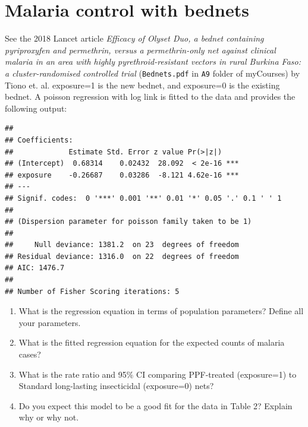 \documentclass[landscape,twocolumn,letterpaper,9pt,reqno]{article}\usepackage[]{graphicx}\usepackage[]{color}
\newenvironment{knitrout}{}{} %
\newcommand{\compresslist}{ %
	\setlength{\itemsep}{1pt}
	\setlength{\parskip}{0pt}
	\setlength{\parsep}{0pt}
}
\begin{document}
\clearpage


\section{Malaria control with bednets}

See the 2018 Lancet article \textit{Efficacy of Olyset Duo, a bednet containing pyriproxyfen and permethrin, versus a permethrin-only net against clinical malaria in an area with highly pyrethroid-resistant vectors in rural Burkina Faso: a cluster-randomised
	controlled trial} (\texttt{Bednets.pdf} in \texttt{A9} folder of myCourses) by Tiono et. al. exposure=1 is the new bednet, and exposure=0 is the existing bednet. A poisson regression with log link is fitted to the data and provides the following output:




\begin{knitrout}
\color{fgcolor}
\begin{verbatim}
## 
## Coefficients:
##             Estimate Std. Error z value Pr(>|z|)    
## (Intercept)  0.68314    0.02432  28.092  < 2e-16 ***
## exposure    -0.26687    0.03286  -8.121 4.62e-16 ***
## ---
## Signif. codes:  0 '***' 0.001 '**' 0.01 '*' 0.05 '.' 0.1 ' ' 1
## 
## (Dispersion parameter for poisson family taken to be 1)
## 
##     Null deviance: 1381.2  on 23  degrees of freedom
## Residual deviance: 1316.0  on 22  degrees of freedom
## AIC: 1476.7
## 
## Number of Fisher Scoring iterations: 5
\end{verbatim}

\end{knitrout}





\begin{enumerate}\compresslist
	\item What is the regression equation in terms of population parameters? Define all your parameters. 
	\item What is the fitted regression equation for the expected counts of malaria cases?
	\item What is the rate ratio and 95\% CI comparing PPF-treated (exposure=1) to Standard long-lasting insecticidal (exposure=0) nets?
	\item Do you expect this model to be a good fit for the data in Table 2? Explain why or why not.
\end{enumerate}
\end{document}
